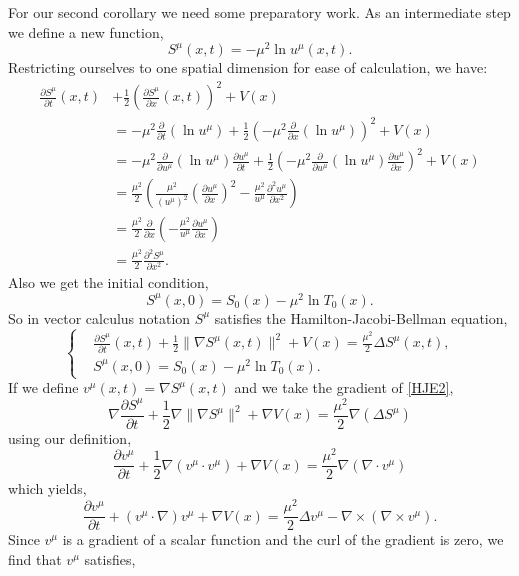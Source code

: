 \documentclass[a4paper,12pt,draft]{report}
\theoremstyle{remark}
\theoremstyle{definition}
\begin{document}
For our second corollary we need some preparatory work.  As an intermediate step we define a new function,
$$
S^\mu(x, t) = -\mu^2\ln u^\mu(x, t).
$$
Restricting ourselves to one spatial dimension for ease of calculation, we have:
\begin{align}
\frac{\partial S^\mu}{\partial t}(x, t) & + \frac{1}{2}\left(\frac{\partial S^\mu}{\partial x}(x, t)\right)^2 + V(x)\nonumber\\
& = -\mu^2\frac{\partial}{\partial t}(\ln u^\mu) + \frac{1}{2}\left(-\mu^2\frac{\partial}{\partial x}(\ln u^\mu)\right)^2 + V(x)\nonumber\\
& = -\mu^2\frac{\partial}{\partial u^\mu}(\ln u^\mu)\frac{\partial u^\mu}{\partial t} + \frac{1}{2}\left(-\mu^2\frac{\partial}{\partial u^\mu}(\ln u^\mu)\frac{\partial u^\mu}{\partial x}\right)^2 + V(x)\nonumber\\
& = \frac{\mu^2}{2}\left(\frac{\mu^2}{(u^\mu)^2}\left(\frac{\partial u^\mu}{\partial x}\right)^2 - \frac{\mu^2}{u^\mu}\frac{\partial^2 u^\mu}{\partial x^2}\right)\nonumber\\
& = \frac{\mu^2}{2}\frac{\partial}{\partial x}\left(-\frac{\mu^2}{u^\mu}\frac{\partial u^\mu}{\partial x}\right)\nonumber\\
& = \frac{\mu^2}{2}\frac{\partial^2 S^\mu}{\partial x^2}.\nonumber
\end{align}
Also we get the initial condition,
$$
S^\mu(x, 0) = S_0(x) - \mu^2\ln T_0(x).
$$
So in vector calculus notation $S^\mu$ satisfies the Hamilton-Jacobi-Bellman equation,
\begin{equation}
\left\{
\begin{aligned}
& \frac{\partial S^\mu}{\partial t}(x, t) + \frac{1}{2}\|\nabla S^\mu(x, t)\|^2 + V(x) = \frac{\mu^2}{2}\Delta S^\mu(x, t),\\ \label{HJE2}
& S^\mu(x, 0) = S_0(x) - \mu^2\ln T_0(x).
\end{aligned}
\right.
\end{equation}
If we define $v^\mu(x, t) = \nabla S^\mu(x, t)$ and we take the gradient of \eqref{HJE2},
$$
\nabla\frac{\partial S^\mu}{\partial t} + \frac{1}{2}\nabla\|\nabla S^\mu\|^2 + \nabla V(x) = \frac{\mu^2}{2}\nabla(\Delta S^\mu)
$$
using our definition,
$$
\frac{\partial v^\mu}{\partial t} + \frac{1}{2}\nabla(v^\mu \cdot v^\mu) + \nabla V(x) = \frac{\mu^2}{2}\nabla(\nabla \cdot v^\mu)
$$
which yields,
$$
\frac{\partial v^\mu}{\partial t} + (v^\mu\cdot \nabla)v^\mu + \nabla V(x) = \frac{\mu^2}{2}\Delta v^\mu - \nabla \times (\nabla \times v^\mu).
$$
Since $v^\mu$ is a gradient of a scalar function and the curl of the gradient is zero, we find that $v^\mu$ satisfies,
\end{document}
